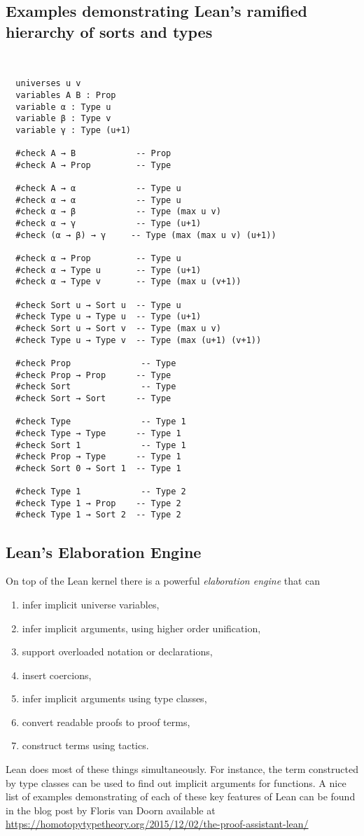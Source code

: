 \documentclass[11pt]{amsart}  %
\begin{document}
\subsection{Examples demonstrating Lean's ramified hierarchy of sorts and types}
\label{sec:sorts-and-types}
~
\begin{lstlisting}
  universes u v
  variables A B : Prop
  variable α : Type u
  variable β : Type v
  variable γ : Type (u+1)

  #check A → B            -- Prop
  #check A → Prop         -- Type

  #check A → α            -- Type u
  #check α → α            -- Type u
  #check α → β            -- Type (max u v)
  #check α → γ            -- Type (u+1) 
  #check (α → β) → γ     -- Type (max (max u v) (u+1))

  #check α → Prop         -- Type u
  #check α → Type u       -- Type (u+1)
  #check α → Type v       -- Type (max u (v+1))

  #check Sort u → Sort u  -- Type u
  #check Type u → Type u  -- Type (u+1)
  #check Sort u → Sort v  -- Type (max u v)
  #check Type u → Type v  -- Type (max (u+1) (v+1))

  #check Prop              -- Type 
  #check Prop → Prop      -- Type 
  #check Sort              -- Type 
  #check Sort → Sort      -- Type 

  #check Type              -- Type 1
  #check Type → Type      -- Type 1
  #check Sort 1            -- Type 1
  #check Prop → Type      -- Type 1
  #check Sort 0 → Sort 1  -- Type 1

  #check Type 1            -- Type 2
  #check Type 1 → Prop    -- Type 2
  #check Type 1 → Sort 2  -- Type 2
\end{lstlisting}


\subsection{Lean's Elaboration Engine}

On top of the Lean kernel there is a powerful \emph{elaboration engine} that can
\begin{enumerate}
\item infer implicit universe variables,
\item infer implicit arguments, using higher order unification,
\item support overloaded notation or declarations,
\item insert coercions,
\item infer implicit arguments using type classes,
\item convert readable proofs to proof terms,
\item construct terms using tactics.
\end{enumerate}
Lean does most of these things simultaneously. For instance, the term constructed by
type classes can be used to find out implicit arguments for functions.
A nice list of examples demonstrating of each of these key features of Lean can be found in the blog post by Floris van Doorn available at
\url{https://homotopytypetheory.org/2015/12/02/the-proof-assistant-lean/}
\end{document}
